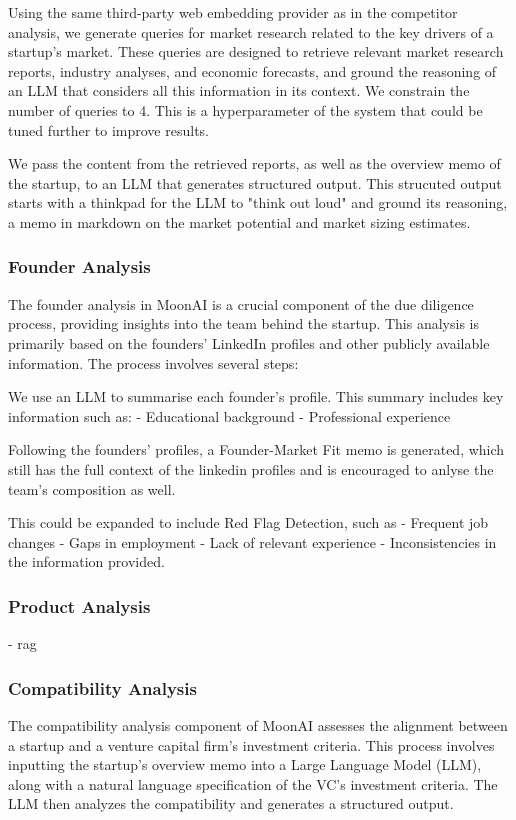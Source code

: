 \documentclass[a4paper, oneside]{discothesis}
\begin{document}
Using the same third-party web embedding provider as in the competitor analysis, we generate queries for market research related to the key drivers of a startup's market. These queries are designed to retrieve relevant market research reports, industry analyses, and economic forecasts, and ground the reasoning of an LLM that considers all this information in its context. We constrain the number of queries to 4. This is a hyperparameter of the system that could be tuned further to improve results. 

We pass the content from the retrieved reports, as well as the overview memo of the startup, to an LLM that generates structured output. This strucuted output starts with a thinkpad for the LLM to "think out loud" and ground its reasoning, a memo in markdown on the market potential and market sizing estimates. 

\subsubsection{Founder Analysis}
The founder analysis in MoonAI is a crucial component of the due diligence process, providing insights into the team behind the startup. This analysis is primarily based on the founders' LinkedIn profiles and other publicly available information. The process involves several steps:

We use an LLM to summarise each founder's profile. This summary includes key information such as:
   - Educational background
   - Professional experience

Following the founders' profiles, a Founder-Market Fit memo is generated, which still has the full context of the linkedin profiles and is encouraged to anlyse the team's composition as well. 

This could be expanded to include Red Flag Detection, such as
   - Frequent job changes
   - Gaps in employment
   - Lack of relevant experience
   - Inconsistencies in the information provided. 

   \subsubsection{Product Analysis}
- rag 
\subsubsection{Compatibility Analysis}
The compatibility analysis component of MoonAI assesses the alignment between a startup and a venture capital firm's investment criteria. This process involves inputting the startup's overview memo into a Large Language Model (LLM), along with a natural language specification of the VC's investment criteria. The LLM then analyzes the compatibility and generates a structured output.
\end{document}
